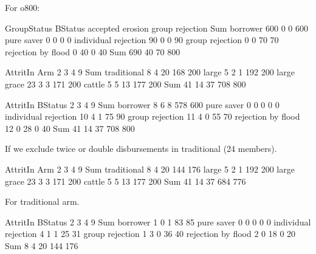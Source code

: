 For \textsf{o800}:
\begin{Schunk}
\begin{Soutput}
                      GroupStatus
BStatus                accepted erosion group rejection Sum
  borrower                  600       0               0 600
  pure saver                  0       0               0   0
  individual rejection       90       0               0  90
  group rejection             0       0              70  70
  rejection by flood          0      40               0  40
  Sum                       690      40              70 800
\end{Soutput}
\begin{Soutput}
             AttritIn
Arm             2   3   4   9 Sum
  traditional   8   4  20 168 200
  large         5   2   1 192 200
  large grace  23   3   3 171 200
  cattle        5   5  13 177 200
  Sum          41  14  37 708 800
\end{Soutput}
\begin{Soutput}
                      AttritIn
BStatus                  2   3   4   9 Sum
  borrower               8   6   8 578 600
  pure saver             0   0   0   0   0
  individual rejection  10   4   1  75  90
  group rejection       11   4   0  55  70
  rejection by flood    12   0  28   0  40
  Sum                   41  14  37 708 800
\end{Soutput}
\end{Schunk}
If we exclude twice or double disbursements in traditional (24 members).
\begin{Schunk}
\begin{Soutput}
             AttritIn
Arm             2   3   4   9 Sum
  traditional   8   4  20 144 176
  large         5   2   1 192 200
  large grace  23   3   3 171 200
  cattle        5   5  13 177 200
  Sum          41  14  37 684 776
\end{Soutput}
\end{Schunk}
For \textsf{traditional} arm.
\begin{Schunk}
\begin{Soutput}
                      AttritIn
BStatus                  2   3   4   9 Sum
  borrower               1   0   1  83  85
  pure saver             0   0   0   0   0
  individual rejection   4   1   1  25  31
  group rejection        1   3   0  36  40
  rejection by flood     2   0  18   0  20
  Sum                    8   4  20 144 176
\end{Soutput}
\end{Schunk}


